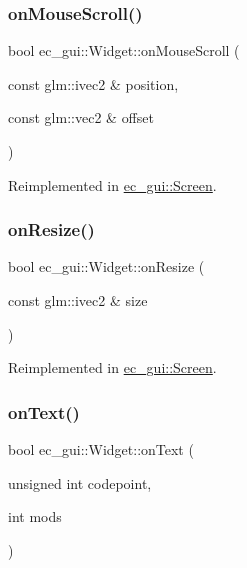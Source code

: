 \subsubsection{\texorpdfstring{on\+Mouse\+Scroll()}{onMouseScroll()}}
{\footnotesize\ttfamily bool ec\+\_\+gui\+::\+Widget\+::on\+Mouse\+Scroll (\begin{DoxyParamCaption}\item[{const glm\+::ivec2 \&}]{position,  }\item[{const glm\+::vec2 \&}]{offset }\end{DoxyParamCaption})\hspace{0.3cm}{\ttfamily [virtual]}}



Reimplemented in \mbox{\hyperlink{classec__gui_1_1_screen_ad0ffcfff7027005dd6cd8d5dcc168a0c}{ec\+\_\+gui\+::\+Screen}}.

\mbox{\label{classec__gui_1_1_widget_a8894ab7ea0791865e6fe8ea5d909f071}} 
\subsubsection{\texorpdfstring{on\+Resize()}{onResize()}}
{\footnotesize\ttfamily bool ec\+\_\+gui\+::\+Widget\+::on\+Resize (\begin{DoxyParamCaption}\item[{const glm\+::ivec2 \&}]{size }\end{DoxyParamCaption})\hspace{0.3cm}{\ttfamily [virtual]}}



Reimplemented in \mbox{\hyperlink{classec__gui_1_1_screen_a5aae70a6f4fab5d4242d32fe2ce29889}{ec\+\_\+gui\+::\+Screen}}.

\mbox{\label{classec__gui_1_1_widget_a794ce0ee48989a1dbc40cad96a11eb9a}} 
\subsubsection{\texorpdfstring{on\+Text()}{onText()}}
{\footnotesize\ttfamily bool ec\+\_\+gui\+::\+Widget\+::on\+Text (\begin{DoxyParamCaption}\item[{unsigned int}]{codepoint,  }\item[{int}]{mods }\end{DoxyParamCaption})\hspace{0.3cm}{\ttfamily [virtual]}}



